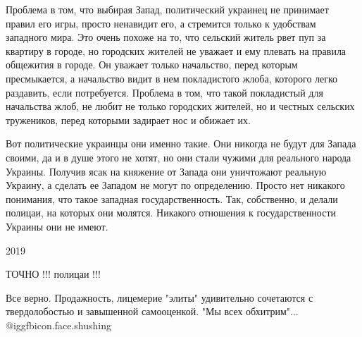 Проблема в том, что выбирая Запад, политический украинец не принимает правил
его игры, просто ненавидит его, а стремится только к удобствам западного мира.
Это очень похоже на то, что сельский житель рвет пуп за квартиру в городе, но
городских жителей не уважает и ему плевать на правила общежития в городе. Он
уважает только начальство, перед которым пресмыкается, а начальство видит в нем
покладистого жлоба, которого легко раздавить, если потребуется. Проблема в том,
что такой покладистый для начальства жлоб, не любит не только городских
жителей, но и честных сельских тружеников, перед которыми задирает нос и
обижает их. 

Вот политические украинцы они именно такие. Они никогда не будут для Запада
своими, да и в душе этого не хотят, но они стали чужими для реального народа
Украины. Получив ясак на княжение от Запада они уничтожают реальную Украину, а
сделать ее Западом не могут по определению. Просто нет никакого понимания, что
такое западная государственность. Так, собственно, и делали полицаи, на которых
они молятся. Никакого отношения к государственности Украины они не имеют.

2019

\begin{itemize} %
ТОЧНО !!! полицаи !!!

Все верно. Продажность, лицемерие "элиты" удивительно сочетаются с твердолобостью и завышенной самооценкой. "Мы всех обхитрим"... 
@igg{fbicon.face.shushing} 
\end{itemize} %
